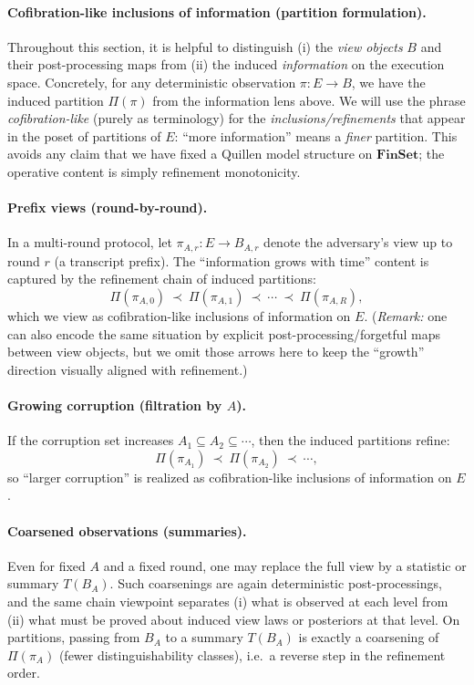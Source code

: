 \documentclass[11pt,a4paper]{article}
\theoremstyle{definition}
\theoremstyle{plain}
\begin{document}
\paragraph{Cofibration-like inclusions of information (partition formulation).}
Throughout this section, it is helpful to distinguish (i) the \emph{view objects} $B$ and their post-processing maps from (ii) the induced \emph{information} on the execution space.
Concretely, for any deterministic observation $\pi:E\to B$, we have the induced partition $\Pi(\pi)$ from the information lens above.
We will use the phrase \emph{cofibration-like} (purely as terminology) for the \emph{inclusions/refinements} that appear in the poset of partitions of $E$:
``more information'' means a \emph{finer} partition.
This avoids any claim that we have fixed a Quillen model structure on $\mathbf{FinSet}$; the operative content is simply refinement monotonicity.

\paragraph{Prefix views (round-by-round).}
In a multi-round protocol, let $\pi_{A,r}:E\to B_{A,r}$ denote the adversary's view up to round $r$ (a transcript prefix).
The ``information grows with time'' content is captured by the refinement chain of induced partitions:
\[
\Pi(\pi_{A,0})\ \prec\ \Pi(\pi_{A,1})\ \prec\ \cdots\ \prec\ \Pi(\pi_{A,R}),
\]
which we view as cofibration-like inclusions of information on $E$.
(\emph{Remark:} one can also encode the same situation by explicit post-processing/forgetful maps between view objects, but we omit those arrows here to keep the ``growth'' direction visually aligned with refinement.)

\paragraph{Growing corruption (filtration by $A$).}
If the corruption set increases $A_1\subseteq A_2\subseteq\cdots$, then the induced partitions refine:
\[
\Pi(\pi_{A_1})\ \prec\ \Pi(\pi_{A_2})\ \prec\ \cdots,
\]
so ``larger corruption'' is realized as cofibration-like inclusions of information on $E$.

\paragraph{Coarsened observations (summaries).}
Even for fixed $A$ and a fixed round, one may replace the full view by a statistic or summary $T(B_A)$.
Such coarsenings are again deterministic post-processings, and the same chain viewpoint separates (i) what is observed at each level from (ii) what must be proved about induced view laws or posteriors at that level.
On partitions, passing from $B_A$ to a summary $T(B_A)$ is exactly a coarsening of $\Pi(\pi_A)$ (fewer distinguishability classes), i.e.\ a reverse step in the refinement order.
\end{document}

